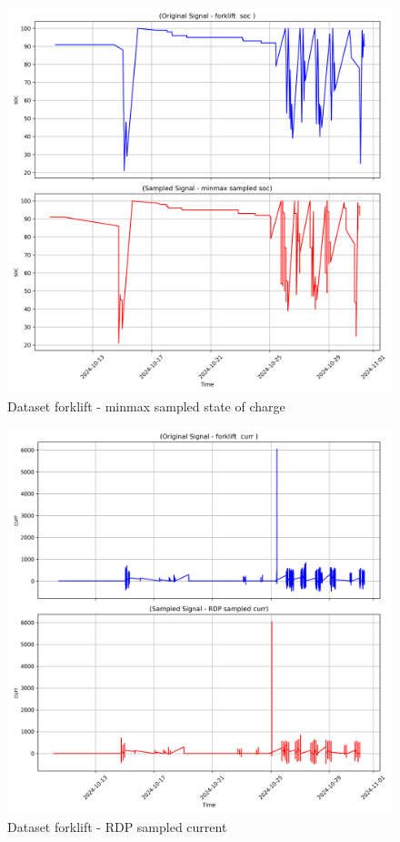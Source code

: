 \begin{figure}
    \centering
    \includegraphics[width=1\linewidth]{screenshots/forklift/minmax_sampled_soc_screenshot.png}
    \caption{Dataset forklift - minmax sampled state of charge }
    \label{fig:forklift_minmax_sampled_soc_screenshot}
\end{figure}
\begin{figure}
    \centering
    \includegraphics[width=1\linewidth]{screenshots/forklift/RDP_sampled_curr_screenshot.png}
    \caption{Dataset forklift - RDP sampled current }
    \label{fig:forklift_RDP_sampled_curr_screenshot}
\end{figure}
